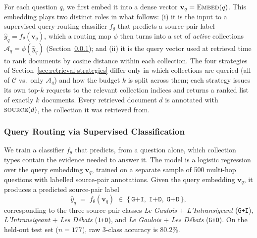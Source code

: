 For each question $q$, we first embed it into a dense vector
$\mathbf{v}_q = \textsc{Embed}(q)$.
This embedding plays two distinct roles in what follows:
(i) it is the input to a supervised query-routing classifier $f_\theta$
that predicts a source-pair label
$\hat{y}_q = f_\theta(\mathbf{v}_q)$, which a routing map $\phi$ then
turns into a set of \emph{active} collections $\mathcal{A}_q = \phi(\hat{y}_q)$
(Section~\ref{sec:classifier}); and (ii) it is the query vector used at
retrieval time to rank documents by cosine distance within each collection.
The four strategies of Section~\ref{sec:retrieval-strategies} differ only in
which collections are queried (all of $\mathcal{C}$ vs.\ only $\mathcal{A}_q$)
and how the budget $k$ is split across them; each strategy issues its own
top-$k$ requests to the relevant collection indices and returns a ranked list
of exactly $k$ documents. Every retrieved document $d$ is annotated with
$\textsc{source}(d)$, the collection it was retrieved from.




\subsubsection{Query Routing via Supervised Classification}
\label{sec:classifier}

We train a classifier $f_\theta$ that predicts, from a question alone, which
collection types contain the evidence needed to answer it.
The model is a logistic regression over the query embedding $\mathbf{v}_q$,
trained on a separate sample of 500 multi-hop questions with
labelled source-pair annotations.
Given the query embedding $\mathbf{v}_q$, it produces a predicted source-pair
label
\begin{equation}
  \label{eq:classifier}
  \hat{y}_q \;=\; f_\theta(\mathbf{v}_q) \;\in\;
  \{\,\texttt{G+I},\; \texttt{I+D},\; \texttt{G+D}\,\},
\end{equation}
corresponding to the three source-pair classes
\textit{Le Gaulois} $+$ \textit{L'Intransigeant} (\texttt{G+I}),
\textit{L'Intransigeant} $+$ \textit{Les Débats} (\texttt{I+D}), and
\textit{Le Gaulois} $+$ \textit{Les Débats} (\texttt{G+D}).
On the held-out test set ($n{=}177$), raw 3-class accuracy is 80.2\%.

